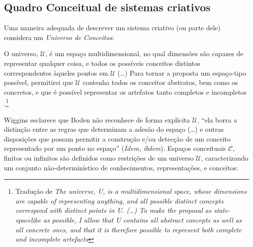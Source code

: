 \subsection{Quadro Conceitual de sistemas criativos}\label{sec:csf}

Uma maneira adequada de descrever um sistema criativo (ou parte dele) considera um \emph{Universo de Conceitos}:

\begin{citacao}
O universo, $\mathcal{U}$, é um espaço multidimensional, no qual dimensões são capazes de representar qualquer coisa, e todos os possíveis conceitos distintos correspondentes àqueles pontos em $\mathcal{U}$ (\ldots) Para tornar a proposta um espaço-tipo possível, permitirei que $\mathcal{U}$ contenha todos os conceitos abstratos, bem como os concretos, e que é possível representar os artefatos tanto completos e incompletos \cite[p.~451]{wiggins_framework_2006}.\footnote{Tradução de \emph{The universe, U, is a multidimensional space, whose dimensions are capable of representing anything, and all possible distinct concepts correspond with distinct points in U. (\ldots) To make the proposal as state-spacelike as possible, I allow that U contains all abstract concepts as well as all concrete ones, and that it is therefore possible to represent both complete and incomplete artefacts}}
\end{citacao}

Wiggins esclarece que Boden não reconhece de forma explícita $\mathcal{U}$, ``ela borra a distinção entre as regras que determinam a adesão do espaço (\ldots) e outras disposições que possam permitir a construção e/ou detecção de um conceito representado por um ponto no espaço'' (\emph{Idem, ibdem}). Espaços conceituais $\mathcal{C}$, finitos ou infinitos são definidos como restrições de um universo $\mathcal{U}$, caracterizando um conjunto não-determinístico de conhecimentos, representações, e conceitos:

\begin{citacao}
\end{citacao}

